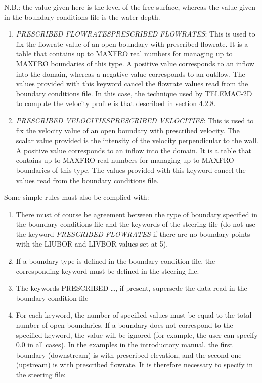 \documentclass{article} %
\begin{document}
 N.B.: the value given here is the level of the free surface, whereas the value given in the boundary conditions file is the water depth.

\begin{enumerate}
\item  \textit{PRESCRIBED FLOWRATESPRESCRIBED FLOWRATES}: This is used to fix the flowrate value of an open boundary with prescribed flowrate. It is a table that contains up to MAXFRO real numbers for managing up to MAXFRO boundaries of this type. A positive value corresponds to an inflow into the domain, whereas a negative value corresponds to an outflow. The values provided with this keyword cancel the flowrate values read from the boundary conditions file. In this case, the technique used by TELEMAC-2D to compute the velocity profile is that described in section 4.2.8.

\item  \textit{PRESCRIBED VELOCITIESPRESCRIBED VELOCITIES}: This is used to fix the velocity value of an open boundary with prescribed velocity. The scalar value provided is the intensity of the velocity perpendicular to the wall. A positive value corresponds to an inflow into the domain. It is a table that contains up to MAXFRO real numbers for managing up to MAXFRO boundaries of this type. The values provided with this keyword cancel the values read from the boundary conditions file.
\end{enumerate}

 Some simple rules must also be complied with:

\begin{enumerate}
\item  There must of course be agreement between the type of boundary specified in the boundary conditions file and the keywords of the steering file (do not use the keyword \textit{PRESCRIBED FLOWRATES} if there are no boundary points with the LIUBOR and LIVBOR values set at 5).

\item  If a boundary type is defined in the boundary condition file, the corresponding keyword must be defined in the steering file.

\item  The keywords PRESCRIBED {\dots}, if present, supersede the data read in the boundary condition file

\item  For each keyword, the number of specified values must be equal to the total number of open boundaries. If a boundary does not correspond to the specified keyword, the value will be ignored (for example, the user can specify 0.0 in all cases). In the examples in the introductory manual, the first boundary (downstream) is with prescribed elevation, and the second one (upstream) is with prescribed flowrate. It is therefore necessary to specify in the steering file:
\end{enumerate}
\end{document}
